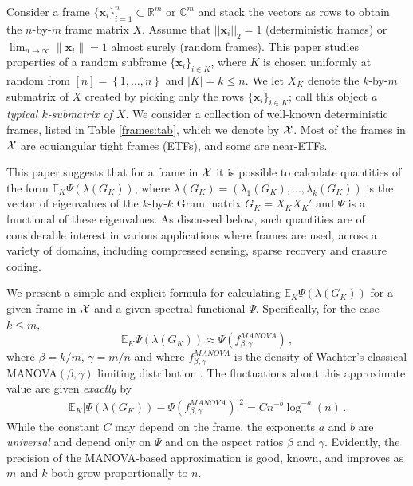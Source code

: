 \documentclass[a4paper,12pt]{article}
\newcommand{\TODO}[1]{ {\tt \color{red} [TODO:#1] } }
\newcommand{\R}{\ensuremath{\mathbb{R}}}
\newcommand{\E}{\ensuremath{\mathbb{E}}}
\newcommand{\C}{\ensuremath{\mathbb{C}}}
\newcommand{\m}{m}
\newcommand{\norm}[1]{\left|\left| #1 \right|\right|}
\newcommand{\specstat}{\ensuremath{\Psi}}
\newcommand{\vx}{\ensuremath{\mathbf{x}}}
\newcommand{\Xk}{\ensuremath{X_K}}
\newcommand{\Gk}{\ensuremath{G_K}}
\begin{document}
\noindent
Consider a frame $\{\vx_i\}_{i=1}^n \subset \R^\m$ or $\C^\m$ 
and stack the vectors as rows to obtain the $n$-by-$\m$ frame matrix $X$. 
Assume that $\norm{
\vx_i}_2=1$ (deterministic frames) or 
$\lim_{n\to \infty}\|\vx_i\|=1$ almost surely (random frames). 
This paper studies properties of a random subframe 
$\{\vx_i\}_{i\in K}$, where $K$ is chosen uniformly at random 
from $[n]=\left\{ 1,\ldots,n \right\}$ and $|K|=k\leq n$.
We let $\Xk$ denote  
the $k$-by-$\m$ submatrix of $X$ created by picking only
the rows $\{\vx_i\}_{i\in K}$; call this object {\em a typical $k$-submatrix
of $X$}.
We consider 
a collection of well-known 
deterministic frames, listed in Table \ref{frames:tab}, 
which we denote by $\cal X$. Most of the frames in $\cal
X$ are equiangular tight frames (ETFs), and some are near-ETFs.

This paper suggests that for a frame in $\cal X$ it is possible to calculate
quantities of the form $\E_K \specstat(\lambda(\Gk))$, 
where $\lambda(\Gk)=(\lambda_1(G_K),...,\lambda_k(G_K))$ is the
vector of eigenvalues of the $k$-by-$k$ Gram matrix $\Gk=\Xk \Xk'$
and $\specstat$ is a functional of these eigenvalues.
As discussed below, such quantities are of considerable interest in various
applications where frames are used, across a variety of domains, including
compressed sensing, sparse
recovery and erasure coding.

We present a simple and explicit formula for calculating 
$\E_K \specstat(\lambda(\Gk))$ for a given frame in $\cal X$ and a given spectral 
functional $\specstat$. Specifically, for the case $k \le m$,
\[
\E_K\specstat(\lambda(\Gk)) \approx \specstat\left( f^{MANOVA}_{\beta,\gamma}
\right)\,, \] 
where $\beta=k/\m$, $\gamma=\m/n$ and where 
$f^{MANOVA}_{\beta,\gamma}$ is the density of
Wachter's classical 
MANOVA$(\beta,\gamma)$
limiting distribution \cite{wachter}. The fluctuations about this approximate 
value are given {\em exactly} by
\begin{eqnarray} \label{main_for:eq}
\E_K \big| \specstat(\lambda(\Gk)) - \specstat\left( f^{MANOVA}_{\beta,\gamma}
\right)\big|^2 =   
C n^{-b} \log^{-a}(n) \,.
\end{eqnarray}
While the constant $C$ may depend on the frame, 
the exponents $a$ and $b$ are {\em universal} and depend only 
on $\specstat$ and on the aspect ratios $\beta$ and $\gamma$. 
Evidently, the precision of the MANOVA-based approximation is good, known, and 
improves as $m$ and $k$ both grow proportionally to $n$.
\end{document}
